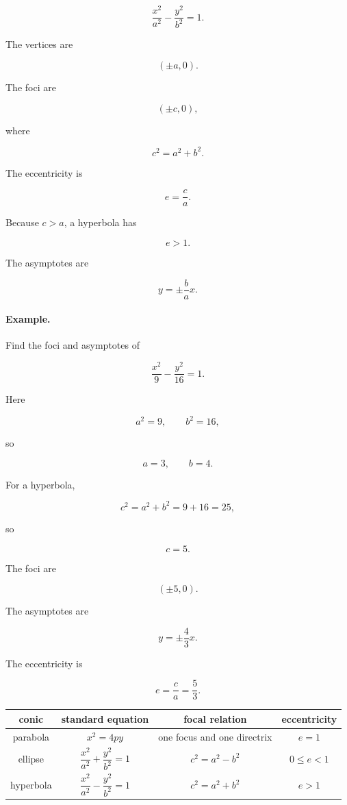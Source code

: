 \[
\boxed{
\frac{x^2}{a^2}-\frac{y^2}{b^2}=1.
}
\]

The vertices are

\[
(\pm a,0).
\]

The foci are

\[
(\pm c,0),
\]

where

\[
\boxed{
c^2=a^2+b^2.
}
\]

The eccentricity is

\[
\boxed{
e=\frac{c}{a}.
}
\]

Because \(c>a\), a hyperbola has

\[
e>1.
\]

The asymptotes are

\[
\boxed{
y=\pm\frac{b}{a}x.
}
\]

\paragraph{Example.}
Find the foci and asymptotes of

\[
\frac{x^2}{9}-\frac{y^2}{16}=1.
\]

Here

\[
a^2=9,
\qquad
b^2=16,
\]

so

\[
a=3,
\qquad
b=4.
\]

For a hyperbola,

\[
c^2=a^2+b^2=9+16=25,
\]

so

\[
c=5.
\]

The foci are

\[
(\pm5,0).
\]

The asymptotes are

\[
y=\pm\frac{4}{3}x.
\]

The eccentricity is

\[
e=\frac{c}{a}=\frac53.
\]

\begin{center}
\begin{tabular}{c|c|c|c}
\textbf{conic} & \textbf{standard equation} & \textbf{focal relation} & \textbf{eccentricity} \\ \hline
parabola & \(x^2=4py\) & one focus and one directrix & \(e=1\) \\[3pt]
ellipse & \(\dfrac{x^2}{a^2}+\dfrac{y^2}{b^2}=1\) & \(c^2=a^2-b^2\) & \(0\le e<1\) \\[8pt]
hyperbola & \(\dfrac{x^2}{a^2}-\dfrac{y^2}{b^2}=1\) & \(c^2=a^2+b^2\) & \(e>1\)
\end{tabular}
\end{center}

